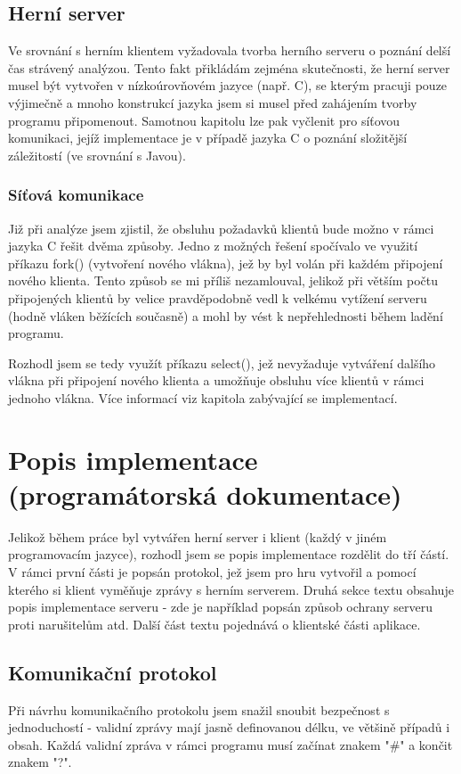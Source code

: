 \documentclass[12pt, a4paper, pdftex, czech, titlepage]{report}
\begin{document}
\section{Herní server}
Ve srovnání s herním klientem vyžadovala tvorba herního serveru o poznání delší čas strávený
analýzou. Tento fakt přikládám zejména skutečnosti, že herní server musel být vytvořen
v nízkoúrovňovém jazyce (např. C), se kterým pracuji pouze výjimečně a mnoho konstrukcí
jazyka jsem si musel před zahájením tvorby programu připomenout. Samotnou kapitolu
lze pak vyčlenit pro síťovou komunikaci, jejíž implementace je v případě jazyka C
o poznání složitější záležitostí (ve srovnání s Javou).

\subsection{Síťová komunikace}
Již při analýze jsem zjistil, že obsluhu požadavků klientů bude možno v rámci
jazyka C řešit dvěma způsoby. Jedno z možných řešení spočívalo ve využití
příkazu fork() (vytvoření nového vlákna), jež by byl volán při každém připojení nového
klienta. Tento způsob se mi příliš nezamlouval, jelikož při větším počtu připojených klientů
by velice pravděpodobně vedl k velkému vytížení serveru (hodně vláken
běžících současně) a mohl by vést k nepřehlednosti během ladění programu.

Rozhodl jsem se tedy využít příkazu select(), jež nevyžaduje
vytváření dalšího vlákna při připojení nového klienta a umožňuje
obsluhu více klientů v rámci jednoho vlákna. Více informací viz kapitola
zabývající se implementací.

\chapter{Popis implementace (programátorská dokumentace)}
Jelikož během práce byl vytvářen herní server i klient (každý v jiném programovacím jazyce),
rozhodl jsem se popis implementace rozdělit do tří částí. V rámci první
části je popsán protokol, jež jsem pro hru vytvořil a pomocí kterého
si klient vyměňuje zprávy s herním serverem. Druhá sekce textu obsahuje popis implementace serveru - zde
je například popsán způsob ochrany serveru proti narušitelům atd. Další část textu pojednává o
klientské části aplikace.

\section{Komunikační protokol}
Při návrhu komunikačního protokolu jsem snažil snoubit bezpečnost s jednoduchostí
- validní zprávy mají jasně definovanou délku, ve většině případů i obsah.
Každá validní zpráva v rámci programu musí začínat znakem "\#" a končit
znakem "?".
\end{document}
